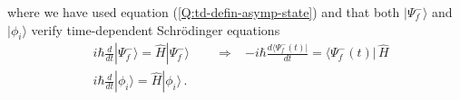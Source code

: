 where we have used equation (\ref{Q:td-defin-asymp-state}) and that both $|\Psi_{f}^{-}\rangle$ and $|\phi_{i}\rangle$ verify time-dependent Schr\"{o}dinger equations
\begin{subequations}
  \begin{align}
    & i \hbar \frac{d}{dt} |\Psi_{f}^{-}\rangle = \hat{H} |\Psi_{f}^{-}\rangle \qquad \Rightarrow & -i \hbar \frac{d \langle \Psi^{-}_{f}(t) | }{dt} = \langle \Psi^{-}_{f}(t) | \, \hat{H}\\
    & i \hbar \frac{d}{dt} |\phi_{i}\rangle = \hat{H} |\phi_{i}\rangle \,.
  \end{align}
\end{subequations}

